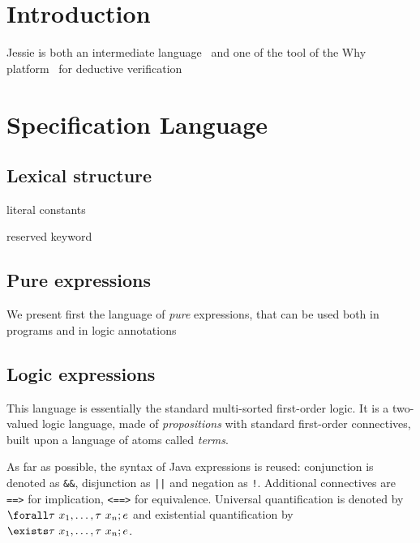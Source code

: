 \documentclass[a4paper,11pt,twoside,openright]{report}
\begin{document}
\sloppy
{}



\tableofcontents

\chapter{Introduction}

Jessie is both an intermediate language~\cite{marche07plpv} and one of
the tool of the Why platform~\cite{filliatre07cav} for deductive verification


\chapter{Specification Language}
\label{chap:reference} 

\section{Lexical structure}

literal constants

reserved keyword

\section{Pure expressions}
\label{sec:expressions}

We present first the language of \emph{pure} expressions, that can be
used both in programs and in logic annotations

\section{Logic expressions}

This language is essentially the standard multi-sorted first-order
logic. It is a two-valued logic language, made of \emph{propositions}
with standard first-order connectives, built upon a language
of atoms called \emph{terms}. 

As far as possible, the syntax of Java expressions is reused:
conjunction is denoted as \verb|&&|, disjunction as \verb+||+ and
negation as \verb|!|.  Additional connectives are \verb|==>| for
implication, \verb|<==>| for equivalence. Universal quantification is
denoted by $\bskw{forall} \tau~x_1,\ldots,\tau~x_n; e$ and existential
quantification by $\bskw{exists} \tau~x_1,\ldots,\tau~x_n; e$.
\end{document}
